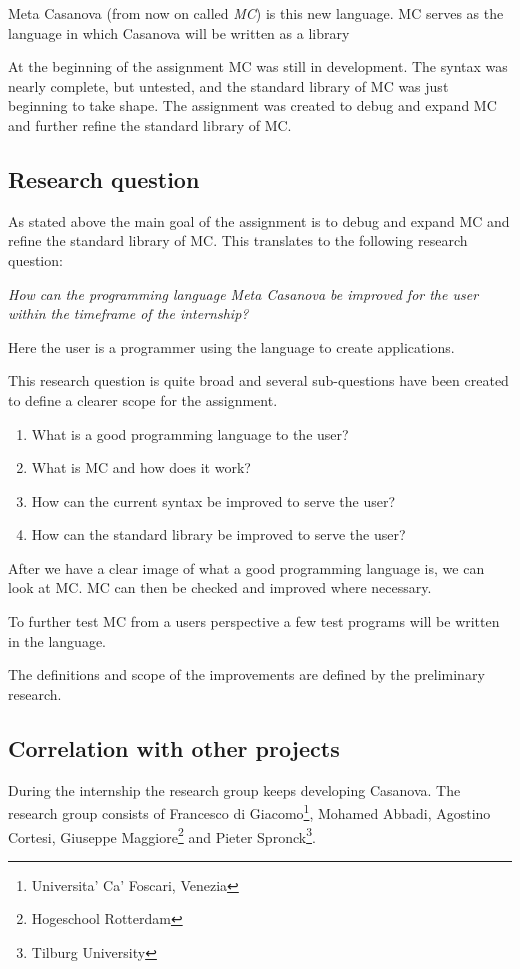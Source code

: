 Meta Casanova (from now on called \emph{MC}) is this new language.
MC serves as the language in which Casanova will be written as a library

At the beginning of the assignment MC was still in development.
The syntax was nearly complete, but untested, and the standard library of MC was just beginning to take shape.
The assignment was created to debug and expand MC and further refine the standard library of MC.


\subsection{Research question}
As stated above the main goal of the assignment is to debug and expand MC and refine the standard library of MC.
This translates to the following research question:

\emph{How can the programming language Meta Casanova be improved for the user within the timeframe of the internship?}

Here the user is a programmer using the language to create applications.

This research question is quite broad and several sub-questions have been created to define a clearer scope for the assignment.

\begin{enumerate}[noitemsep]
   \item What is a good programming language to the user?
   \item What is MC and how does it work?
   \item How can the current syntax be improved to serve the user?
   \item How can the standard library be improved to serve the user?
\end{enumerate}

After we have a clear image of what a good programming language is, we can look at MC.
MC can then be checked and improved where necessary.

To further test MC from a users perspective a few test programs will be written in the language.

The definitions and scope of the improvements are defined by the preliminary research.


\subsection{Correlation with other projects}
During the internship the research group keeps developing Casanova.
The research group consists of
  Francesco di Giacomo\footnote{\label{venice}Universita' Ca' Foscari, Venezia},
  Mohamed Abbadi,
  Agostino Cortesi,
  Giuseppe Maggiore\footnote{Hogeschool Rotterdam} and
  Pieter Spronck\footnote{Tilburg University}.

